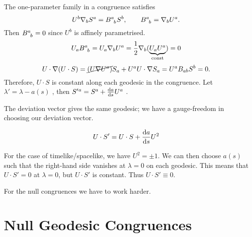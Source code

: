 The one-parameter family in a congruence satisfies
\begin{equation}
  U^{b} \nabla_b S^{a} = B\indices{^{a}_{b}} S^{b}, \qquad B\indices{^{a}_{b}} = \nabla_b U^a.
\end{equation}
Then $B\indices{^{a}_{b}} = 0$  since $U^{b}$  is affinely parametrised.
\begin{equation}
  U_a B\indices{^{a}_{b}} = U_a \nabla_b U^{a}  =\frac{1}{2} \nabla_b (\underbrace{U_{a} U^a}_{\mathclap{\text{const}}}) = 0
\end{equation}
\begin{equation}
  U \cdot \nabla (U \cdot S) = \cancel{(U \nabla U^a)} S_a + U^a U \cdot \nabla S_a = U^a B_{ab} S^b = 0.
\end{equation}
Therefore, $U \cdot S$  is constant along each geodesic in the congruence.
Let $\lambda' = \lambda - a(s)$ , then $S'{}^a = S^a + \dv{a}{s} U^a$ .
\begin{exercise}
  The deviation vector gives the same geodesic; we have a gauge-freedom in choosing our deviation vector.
\end{exercise}
\begin{equation}
  U \cdot S' = U \cdot S + \dv{a}{s} U^2
\end{equation}
\begin{figure}[tbhp]
  \centering
  \def\svgwidth{0.4\columnwidth}
  
  \caption{}
  \label{fig:l9f2}
\end{figure}
For the case of timelike/spacelike, we have $U^2 = \pm 1$. We can then choose $a(s)$ such that the right-hand side vanishes at $\lambda =0$ on each geodesic.
This means that $U \cdot S' = 0$ at $\lambda = 0$, but $U \cdot S'$ is constant.
Thus $U \cdot S' \equiv 0$.

For the null congruences we have to work harder.
\section{Null Geodesic Congruences}%
\label{sec:null_geodesic_congruences}

